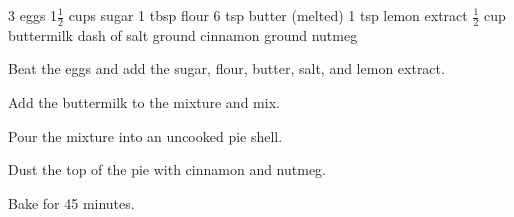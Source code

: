 \dishtype{}
\begin{ingreds}
    3 eggs
    1$\frac{1}{2}$ cups sugar
    1 tbsp flour
    6 tsp butter (melted)
    1 tsp lemon extract
    $\frac{1}{2}$ cup buttermilk
    dash of salt
    ground cinnamon
    ground nutmeg
\end{ingreds}
\begin{method}
    Beat the eggs and add the sugar, flour, butter, salt, and lemon extract.\par
    Add the buttermilk to the mixture and mix.\par
    Pour the mixture into an uncooked pie shell.\par
    Dust the top of the pie with cinnamon and nutmeg.\par
    Bake for 45 minutes.
\end{method}